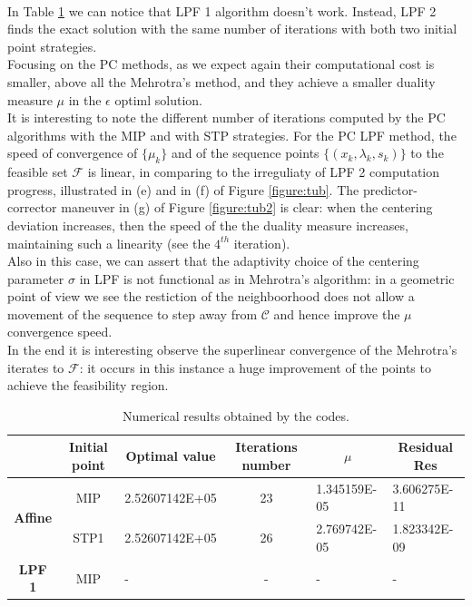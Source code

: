\documentclass[a4paper,10 pt,titlepage,twoside]{report}
\theoremstyle{plain}
\theoremstyle{definition}
\theoremstyle{remark}
\begin{document}
{{\\In Table \ref{table:TP} we can notice that LPF 1 algorithm doesn't work. Instead, LPF 2 finds the exact solution with the same number of iterations with both two initial point strategies. \\
Focusing on the PC methods, as we expect again their computational cost is smaller, above all the Mehrotra's method, and they achieve a smaller duality measure $\mu$ in the $\epsilon$ optiml solution.\\ It is interesting to note the different number of iterations computed by the PC algorithms with the MIP and with STP strategies. For the PC LPF method, the speed of convergence of $\{\mu_{k}\}$ and of the sequence points $\{(x_{k},\lambda_{k},s_{k})\}$ to the feasible set $\mathcal{F}$ is linear, in comparing to the irreguliaty of LPF 2 computation progress, illustrated in (e) and in (f) of Figure \ref{figure:tub}.
The predictor-corrector maneuver in (g) of Figure \ref{figure:tub2} is clear: when the centering deviation increases, then the speed of the the duality measure increases, maintaining such a linearity (see the $4^{th}$ iteration).\\
Also in this case, we can assert that the adaptivity choice of the centering parameter $\sigma$ in LPF is not functional as in Mehrotra's algorithm: in a geometric point of view we see the restiction of the neighboorhood does not allow a movement of the sequence to step away from $\mathcal{C}$ and hence improve the $\mu$ convergence speed.\\
In the end it is interesting observe the superlinear convergence of the Mehrotra's iterates to $\mathcal{F}$: it occurs in this instance a huge improvement of the points to achieve the feasibility region.
\begin{table}[]\caption{\label{table:TP}Numerical results obtained by the codes.}
	\begin{tabular}{cclcll}
		\hline		\textbf{} & \textbf{Initial point} & \multicolumn{1}{c}{\textbf{Optimal value}} & \textbf{Iterations number} & \multicolumn{1}{c}{\textbf{$\mu$}} & \multicolumn{1}{c}{\textbf{Residual} Res} \\ \hline
		\multicolumn{1}{c|}{\multirow{2}{*}{\textbf{Affine}}} & MIP & 2.52607142E+05 & 23 & 1.345159E-05 & 3.606275E-11 \\
		\multicolumn{1}{c|}{} & STP1 & 2.52607142E+05 & 26 & 2.769742E-05 & 1.823342E-09 \\ \hline
		\multicolumn{1}{c|}{\multirow{2}{*}{\textbf{LPF 1}}} & MIP & - & - & - & - \\

\end{tabular}
\end{table}}}
\end{document}
